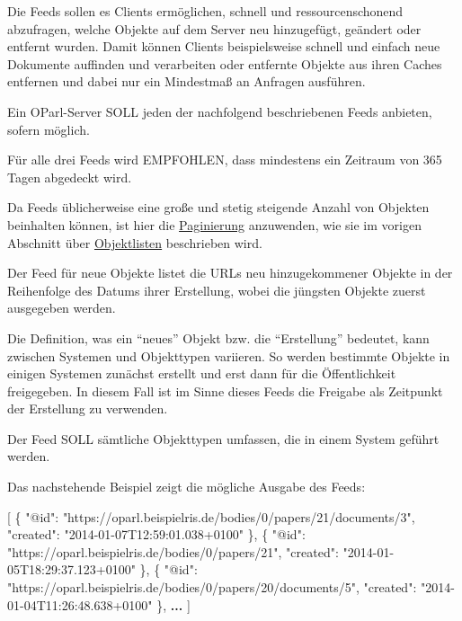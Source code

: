 \documentclass[,a4paper]{article}
\newenvironment{Shaded}{}{}
\newcommand{\DataTypeTok}[1]{\textcolor[rgb]{0.56,0.13,0.00}{{#1}}}
\newcommand{\StringTok}[1]{\textcolor[rgb]{0.25,0.44,0.63}{{#1}}}
\newcommand{\OtherTok}[1]{\textcolor[rgb]{0.00,0.44,0.13}{{#1}}}
\newcommand{\FunctionTok}[1]{\textcolor[rgb]{0.02,0.16,0.49}{{#1}}}
\newcommand{\ErrorTok}[1]{\textcolor[rgb]{1.00,0.00,0.00}{\textbf{{#1}}}}
\begin{document}
Die Feeds sollen es Clients ermöglichen, schnell und ressourcenschonend
abzufragen, welche Objekte auf dem Server neu hinzugefügt, geändert oder
entfernt wurden. Damit können Clients beispielsweise schnell und einfach
neue Dokumente auffinden und verarbeiten oder entfernte Objekte aus
ihren Caches entfernen und dabei nur ein Mindestmaß an Anfragen
ausführen.

Ein OParl-Server SOLL jeden der nachfolgend beschriebenen Feeds
anbieten, sofern möglich.

Für alle drei Feeds wird EMPFOHLEN, dass mindestens ein Zeitraum von 365
Tagen abgedeckt wird.

Da Feeds üblicherweise eine große und stetig steigende Anzahl von
Objekten beinhalten können, ist hier die
\hyperref[paginierung]{Paginierung} anzuwenden, wie sie im vorigen
Abschnitt über \hyperref[objektlisten]{Objektlisten} beschrieben wird.


Der Feed für neue Objekte listet die URLs neu hinzugekommener Objekte in
der Reihenfolge des Datums ihrer Erstellung, wobei die jüngsten Objekte
zuerst ausgegeben werden.

Die Definition, was ein ``neues'' Objekt bzw. die ``Erstellung''
bedeutet, kann zwischen Systemen und Objekttypen variieren. So werden
bestimmte Objekte in einigen Systemen zunächst erstellt und erst dann
für die Öffentlichkeit freigegeben. In diesem Fall ist im Sinne dieses
Feeds die Freigabe als Zeitpunkt der Erstellung zu verwenden.

Der Feed SOLL sämtliche Objekttypen umfassen, die in einem System
geführt werden.

Das nachstehende Beispiel zeigt die mögliche Ausgabe des Feeds:

\begin{Shaded}
\begin{Highlighting}[]
\OtherTok{[}
    \FunctionTok{\{}
        \DataTypeTok{"@id"}\FunctionTok{:} \StringTok{"https://oparl.beispielris.de/bodies/0/papers/21/documents/3"}\FunctionTok{,}
        \DataTypeTok{"created"}\FunctionTok{:} \StringTok{"2014-01-07T12:59:01.038+0100"}
    \FunctionTok{\}}\OtherTok{,}
    \FunctionTok{\{}
        \DataTypeTok{"@id"}\FunctionTok{:} \StringTok{"https://oparl.beispielris.de/bodies/0/papers/21"}\FunctionTok{,}
        \DataTypeTok{"created"}\FunctionTok{:} \StringTok{"2014-01-05T18:29:37.123+0100"}
    \FunctionTok{\}}\OtherTok{,}
    \FunctionTok{\{}
        \DataTypeTok{"@id"}\FunctionTok{:} \StringTok{"https://oparl.beispielris.de/bodies/0/papers/20/documents/5"}\FunctionTok{,}
        \DataTypeTok{"created"}\FunctionTok{:} \StringTok{"2014-01-04T11:26:48.638+0100"}
    \FunctionTok{\}}\OtherTok{,}
    \ErrorTok{...}
\OtherTok{]}
\end{Highlighting}
\end{Shaded}
\end{document}
